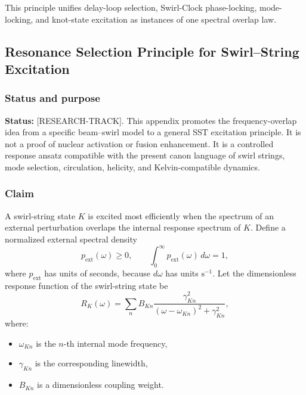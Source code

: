    This principle unifies delay-loop selection, Swirl-Clock phase-locking,
    mode-locking, and knot-state excitation as instances of one spectral
    overlap law.
    
    
\subsection{Resonance Selection Principle for Swirl--String Excitation}
    \label{app:resonance-selection-principle}
    
    \subsubsection*{Status and purpose}
        
        \noindent
        \textbf{Status:} [RESEARCH-TRACK].
        This appendix promotes the frequency-overlap idea from a specific beam--swirl model to a general SST excitation principle. It is not a proof of nuclear activation or fusion enhancement. It is a controlled response ansatz compatible with the present canon language of swirl strings, mode selection, circulation, helicity, and Kelvin-compatible dynamics.
    
    \subsubsection*{Claim}
        
        A swirl-string state \(K\) is excited most efficiently when the spectrum of an external perturbation overlaps the internal response spectrum of \(K\). Define a normalized external spectral density
        \begin{equation}
            p_{\mathrm{ext}}(\omega)\ge 0,
            \qquad
            \int_0^\infty p_{\mathrm{ext}}(\omega)\,d\omega = 1,
            \label{eq:p_ext_normalized}
        \end{equation}
        where \(p_{\mathrm{ext}}\) has units of seconds, because \(d\omega\) has units \(\mathrm{s}^{-1}\). Let the dimensionless response function of the swirl-string state be
        \begin{equation}
            R_K(\omega)
            =
            \sum_{n}
            B_{Kn}
            \frac{\gamma_{Kn}^{2}}
            {(\omega-\omega_{Kn})^{2}+\gamma_{Kn}^{2}},
            \label{eq:RK_lorentzian}
        \end{equation}
        where:
        \begin{itemize}
            \item \(\omega_{Kn}\) is the \(n\)-th internal mode frequency,
            \item \(\gamma_{Kn}\) is the corresponding linewidth,
            \item \(B_{Kn}\) is a dimensionless coupling weight.
        \end{itemize}
        
